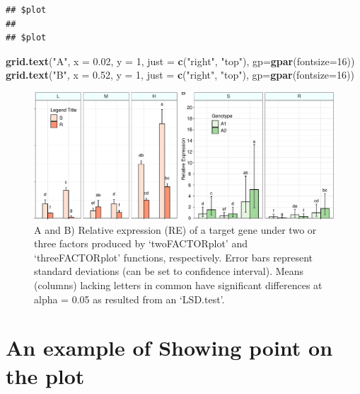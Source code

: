 \documentclass[
]{article}
\newenvironment{Shaded}{\begin{snugshade}}{\end{snugshade}}
\newcommand{\AttributeTok}[1]{\textcolor[rgb]{0.13,0.29,0.53}{#1}}
\newcommand{\DecValTok}[1]{\textcolor[rgb]{0.00,0.00,0.81}{#1}}
\newcommand{\FloatTok}[1]{\textcolor[rgb]{0.00,0.00,0.81}{#1}}
\newcommand{\FunctionTok}[1]{\textcolor[rgb]{0.13,0.29,0.53}{\textbf{#1}}}
\newcommand{\NormalTok}[1]{#1}
\newcommand{\StringTok}[1]{\textcolor[rgb]{0.31,0.60,0.02}{#1}}
\begin{document}
\begin{verbatim}
## $plot
## 
## $plot
\end{verbatim}

\begin{Shaded}
\begin{Highlighting}[]
\FunctionTok{grid.text}\NormalTok{(}\StringTok{"A"}\NormalTok{, }\AttributeTok{x =} \FloatTok{0.02}\NormalTok{, }\AttributeTok{y =} \DecValTok{1}\NormalTok{, }\AttributeTok{just =} \FunctionTok{c}\NormalTok{(}\StringTok{"right"}\NormalTok{, }\StringTok{"top"}\NormalTok{), }\AttributeTok{gp=}\FunctionTok{gpar}\NormalTok{(}\AttributeTok{fontsize=}\DecValTok{16}\NormalTok{))}
\FunctionTok{grid.text}\NormalTok{(}\StringTok{"B"}\NormalTok{, }\AttributeTok{x =} \FloatTok{0.52}\NormalTok{, }\AttributeTok{y =} \DecValTok{1}\NormalTok{, }\AttributeTok{just =} \FunctionTok{c}\NormalTok{(}\StringTok{"right"}\NormalTok{, }\StringTok{"top"}\NormalTok{), }\AttributeTok{gp=}\FunctionTok{gpar}\NormalTok{(}\AttributeTok{fontsize=}\DecValTok{16}\NormalTok{))}
\end{Highlighting}
\end{Shaded}

\begin{figure}

{\centering \includegraphics{vignette_files/figure-latex/unnamed-chunk-13-1} 

}

\caption{A and B) Relative expression (RE) of a target gene under two or three factors produced by ‘twoFACTORplot’ and ‘threeFACTORplot’ functions, respectively. Error bars represent standard deviations (can be set to confidence interval). Means (columns) lacking letters in common have significant differences at alpha = 0.05 as resulted from an ‘LSD.test’.}\label{fig:unnamed-chunk-13}
\end{figure}

\hypertarget{an-example-of-showing-point-on-the-plot}{%
\section{An example of Showing point on the
plot}\label{an-example-of-showing-point-on-the-plot}}
\end{document}
